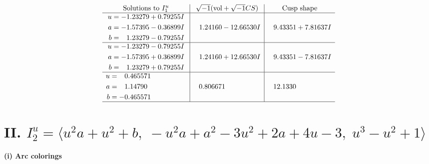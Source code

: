 \documentclass[1p]{elsarticle_modified}
\theoremstyle{definition}
\newcommand{\I}{\sqrt{-1}}
\begin{document}
$$\begin{array}{c|c|c}  
\text{Solutions to }I^u_{1}& \I (\text{vol} + \sqrt{-1}CS) & \text{Cusp shape}\\
 \hline 
\begin{aligned}
u &= -1.23279 + 0.79255 I \\
a &= -1.57395 - 0.36899 I \\
b &= \phantom{-}1.23279 - 0.79255 I\end{aligned}
 & \phantom{-}1.24160 - 12.66530 I & \phantom{-}9.43351 + 7.81637 I \\ \hline\begin{aligned}
u &= -1.23279 - 0.79255 I \\
a &= -1.57395 + 0.36899 I \\
b &= \phantom{-}1.23279 + 0.79255 I\end{aligned}
 & \phantom{-}1.24160 + 12.66530 I & \phantom{-}9.43351 - 7.81637 I \\ \hline\begin{aligned}
u &= \phantom{-}0.465571\phantom{ +0.000000I} \\
a &= \phantom{-}1.14790\phantom{ +0.000000I} \\
b &= -0.465571\phantom{ +0.000000I}\end{aligned}
 & \phantom{-}0.806671\phantom{ +0.000000I} & \phantom{-}12.1330\phantom{ +0.000000I}\\
 \hline 
 \end{array}$$\newpage\newpage\renewcommand{\arraystretch}{1}
\centering \section*{II. $I^u_{2}= \langle u^2 a+u^2+b,\;- u^2 a+a^2-3 u^2+2 a+4 u-3,\;u^3- u^2+1 \rangle$}
\flushleft \textbf{(i) Arc colorings}\\
\end{document}
